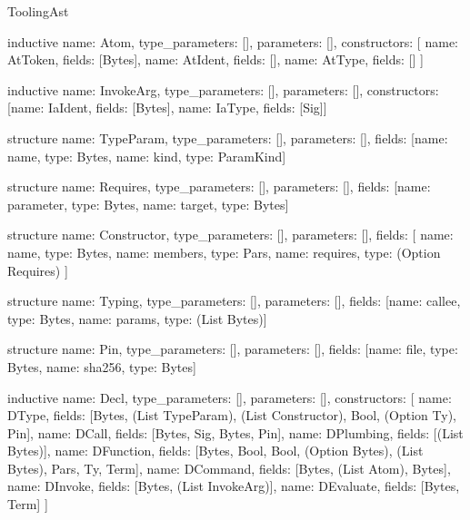 \begin{lexlean}{ToolingAst}
\begin{semanticmodule}
inductive{
  name: Atom,
  type_parameters: [],
  parameters: [],
  constructors: [
    {name: AtToken, fields: [Bytes]},
    {name: AtIdent, fields: []},
    {name: AtType, fields: []}
  ]
}

inductive{
  name: InvokeArg,
  type_parameters: [],
  parameters: [],
  constructors: [{name: IaIdent, fields: [Bytes]}, {name: IaType, fields: [Sig]}]
}

structure{
  name: TypeParam,
  type_parameters: [],
  parameters: [],
  fields: [{name: name, type: Bytes}, {name: kind, type: ParamKind}]
}

structure{
  name: Requires,
  type_parameters: [],
  parameters: [],
  fields: [{name: parameter, type: Bytes}, {name: target, type: Bytes}]
}

structure{
  name: Constructor,
  type_parameters: [],
  parameters: [],
  fields: [
    {name: name, type: Bytes},
    {name: members, type: Pars},
    {name: requires, type: (Option Requires)}
  ]
}

structure{
  name: Typing,
  type_parameters: [],
  parameters: [],
  fields: [{name: callee, type: Bytes}, {name: params, type: (List Bytes)}]
}

structure{
  name: Pin,
  type_parameters: [],
  parameters: [],
  fields: [{name: file, type: Bytes}, {name: sha256, type: Bytes}]
}

inductive{
  name: Decl,
  type_parameters: [],
  parameters: [],
  constructors: [
    {name: DType, fields: [Bytes, (List TypeParam), (List Constructor), Bool, (Option Ty), Pin]},
    {name: DCall, fields: [Bytes, Sig, Bytes, Pin]},
    {name: DPlumbing, fields: [(List Bytes)]},
    {name: DFunction, fields: [Bytes, Bool, Bool, (Option Bytes), (List Bytes), Pars, Ty, Term]},
    {name: DCommand, fields: [Bytes, (List Atom), Bytes]},
    {name: DInvoke, fields: [Bytes, (List InvokeArg)]},
    {name: DEvaluate, fields: [Bytes, Term]}
  ]
}
\end{semanticmodule}
\end{lexlean}
